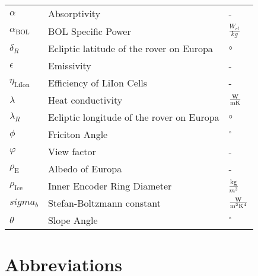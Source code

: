 \begin{longtable}[l]{lll}
$\alpha$				&	Absorptivity								& -  							\\
$\alpha_\text{BOL}$		&	BOL Specific Power							& $\frac{W_{el}}{kg}$			\\
$\delta_R$				&	Ecliptic latitude of the rover on Europa	& $\circ$						\\
\(\epsilon\)			&	Emissivity 									&	-							\\
$\eta_\text{LiIon}$		&	Efficiency of LiIon Cells					& -								\\
$\lambda$				&	Heat conductivity							& $\frac{{\rm W}}{{\rm m} {\rm K}}$			\\
$\lambda_R$				&	Ecliptic longitude of the rover on Europa	& $\circ$						\\
\(\phi\)				&	Friciton Angle								& \(^\circ\)					\\
$\varphi$				&	View factor									& -								\\
\(\rho_\text{E}\)		&	Albedo of Europa			  				&	-	\\
\(\rho_\text{Ice}\)		&	Inner Encoder Ring Diameter  				&	\(\frac{\text{kg}}{m^3}\)	\\
$sigma_b$ 				&	Stefan-Boltzmann constant					& $\frac{{\rm W}}{{\rm m}^2{\rm K}^4}$ \\
\(\theta\)				&	Slope Angle									& \(^\circ\)					\\




\end{longtable}

\chapter*{Abbreviations}


